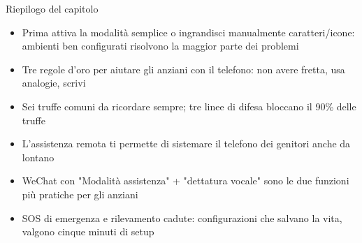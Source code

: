 \begin{tcbsummary}{Riepilogo del capitolo}
\begin{itemize}
  \item Prima attiva la modalità semplice o ingrandisci manualmente caratteri/icone: ambienti ben configurati risolvono la maggior parte dei problemi
  \item Tre regole d'oro per aiutare gli anziani con il telefono: non avere fretta, usa analogie, scrivi
  \item Sei truffe comuni da ricordare sempre; tre linee di difesa bloccano il 90\% delle truffe
  \item L'assistenza remota ti permette di sistemare il telefono dei genitori anche da lontano
  \item WeChat con "Modalità assistenza" + "dettatura vocale" sono le due funzioni più pratiche per gli anziani
  \item SOS di emergenza e rilevamento cadute: configurazioni che salvano la vita, valgono cinque minuti di setup
\end{itemize}

\end{tcbsummary}
